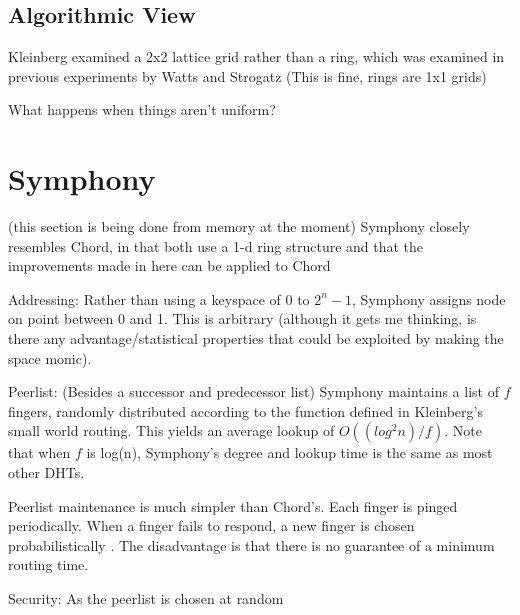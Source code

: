 \documentclass[10pt,letterpaper]{report}
\begin{document}
\subsection{Algorithmic View}


\cite{watts1998collective} 


Kleinberg examined a 2x2 lattice grid rather than a ring, which was examined in previous experiments by Watts and Strogatz  \cite{watts1998collective}
 (This is fine, rings are 1x1 grids)


\cite{kleinberg2000navigation}
\cite{kleinberg2000small}


What happens when things aren't uniform?
\section{Symphony}

(this section is being done from memory at the moment)
Symphony closely resembles Chord, in that both use a 1-d ring structure and that the improvements made in here can be applied to Chord

Addressing:  Rather than using a keyspace of 0 to $2^n - 1$, Symphony assigns node on point between 0 and 1.  This is arbitrary (although it gets me thinking, is there any advantage/statistical properties   that could be exploited by making the space monic).

Peerlist:  (Besides a successor and predecessor list) Symphony maintains a list of $f$ fingers, randomly distributed according to the function defined in Kleinberg's small world routing.  This yields an average lookup of $O((log^{2} n)/f)$.  Note that when $f$ is log(n), Symphony's degree and lookup time is the same as most other DHTs.  

Peerlist maintenance is much simpler than Chord's.  Each finger is pinged periodically.  When a finger fails to respond, a new finger is chosen probabilistically .  The disadvantage is that there is no guarantee of a minimum routing time.

Security:  As the peerlist is chosen at random
\end{document}
